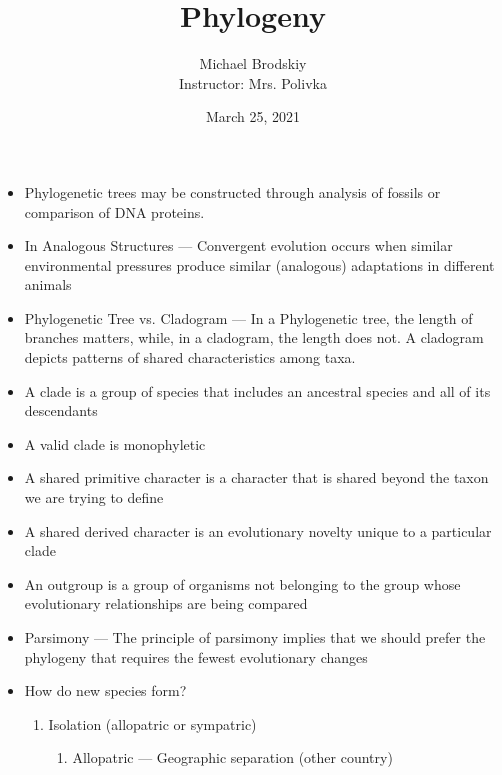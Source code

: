 \documentclass[12pt]{article}
\title{Phylogeny}
\date{March 25, 2021}
\author{Michael Brodskiy\\ \small Instructor: Mrs. Polivka}
\begin{document}
\maketitle

\begin{itemize}

  \item Phylogenetic trees may be constructed through analysis of fossils or comparison of DNA proteins.

  \item In Analogous Structures — Convergent evolution occurs when similar environmental pressures produce similar (analogous) adaptations in different animals

  \item Phylogenetic Tree vs. Cladogram — In a Phylogenetic tree, the length of branches matters, while, in a cladogram, the length does not. A cladogram depicts patterns of shared characteristics among taxa.

  \item A clade is a group of species that includes an ancestral species and all of its descendants

  \item A valid clade is monophyletic

  \item A shared primitive character is a character that is shared beyond the taxon we are trying to define

  \item A shared derived character is an evolutionary novelty unique to a particular clade

  \item An outgroup is a group of organisms not belonging to the group whose evolutionary relationships are being compared

  \item Parsimony — The principle of parsimony implies that we should prefer the phylogeny that requires the fewest evolutionary changes

  \item How do new species form?

    \begin{enumerate}

      \item Isolation (allopatric or sympatric)

        \begin{enumerate}

          \item Allopatric — Geographic separation (other country)


\end{enumerate}
\end{enumerate}
\end{itemize}
\end{document}
